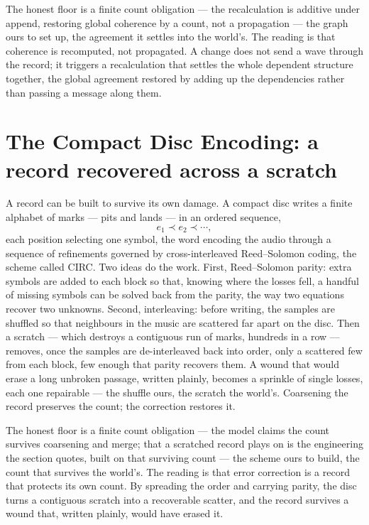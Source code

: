 The honest floor is a finite count obligation --- the recalculation is additive under append, restoring global
coherence by a count, not a propagation --- the graph ours to set up, the agreement it settles into the
world's. The reading is that coherence is recomputed, not propagated. A change
does not send a wave through the record; it triggers a recalculation that settles the whole dependent structure
together, the global agreement restored by adding up the dependencies rather than passing a message along them.

\section{The Compact Disc Encoding: a record recovered across a scratch}
\label{se:compact-disc}

A record can be built to survive its own damage. A compact disc writes a finite alphabet of marks --- pits and
lands --- in an ordered sequence,
\begin{equation}
  e_1 \prec e_2 \prec \cdots,
\end{equation}
each position selecting one symbol, the word encoding the audio through a sequence of refinements governed by
cross-interleaved Reed--Solomon coding, the scheme called CIRC. Two ideas do the work. First, Reed--Solomon
parity: extra symbols are added to each block so that, knowing where the losses fell, a handful of missing
symbols can be solved back from the parity, the way two equations recover two unknowns. Second, interleaving:
before writing, the samples are shuffled so that neighbours in the music are scattered far apart on the disc.
Then a scratch --- which destroys a contiguous run of marks, hundreds in a row --- removes, once the samples
are de-interleaved back into order, only a scattered few from each block, few enough that parity recovers them.
A wound that would erase a long unbroken passage, written plainly, becomes a sprinkle of single losses, each
one repairable --- the shuffle ours, the scratch the world's. Coarsening the record preserves the count; the
correction restores it.

The honest floor is a finite count obligation --- the model claims the count survives coarsening and merge;
that a scratched record plays on is the engineering the section quotes, built on that surviving count --- the
scheme ours to build, the count that survives the world's. The reading is that error correction is a record
that protects its own
count. By spreading the order and carrying parity, the disc turns a contiguous scratch into a recoverable
scatter, and the record survives a wound that, written plainly, would have erased it.

